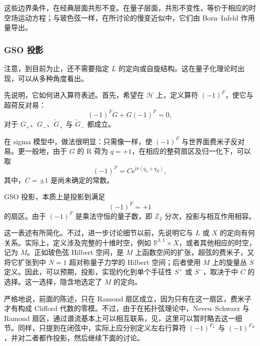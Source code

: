 这些边界条件，在经典层面共形不变。在量子层面，共形不变性，等价于相应的时空场运动方程；与玻色弦一样，在所讨论的慢变近似中，它们由 Born--Infeld 作用量导出。

\subsubsection{GSO 投影}\label{sec:3.5.3.2}

注意，到目前为止，还不需要指定 $L$ 的定向或自旋结构。这在量子化理论时出现，可以从多种角度看出。

先说明，它如何进入算符表述。首先，希望在 $\mathcal{H}$ 上，定义算符 $(-1)^F$，使它与超荷反对易：
\[
(-1)^FG+G(-1)^F=0,
\]
对于 $G_+$、$G_-$、$\widetilde G_+$ 与 $\widetilde G_-$ 都成立。

在 sigma 模型中，做法很明显：只需像一样，使 $(-1)^F$ 与世界面费米子反对易。更一般地，由于 $G$ 的 R 荷为 $q=+1$，在相应的整荷扇区及归一化下，可以取
\begin{equation}\label{eq:3.157}
(-1)^F=C\mathrm{e}^{\mathrm{i}\pi(q_L+q_R)},
\end{equation}
其中，$C=\pm1$ 是尚未确定的常数。

GSO 投影，本质上是投影到满足
\begin{equation}\label{eq:3.158}
(-1)^F=+1
\end{equation}
的扇区。由于 $(-1)^F$ 是乘法守恒的量子数，即 $\mathbb{Z}_2$ 分次，投影与相互作用相容。

这一表述有所简化。不过，进一步讨论细节以前，先说明它与 $L$ 或 $X$ 的定向有何关系。实际上，定义涉及完整的十维时空，例如 $\mathbb{R}^{3,1}\times X$，或者其他相应的时空，记为 $M$。正如玻色弦 Hilbert 空间，是 $M$ 上函数空间的扩张，超弦的费米子，又将它扩张到中 $N=1$ 超对称量子力学的 Hilbert 空间；后者使用 $M$ 上的旋量丛 $S$ 定义。因此，可以预期，投影，实现约化到单个手征性 $S^+$ 或 $S^-$，取决于中 $C$ 的选择。这一选择，隐含地选定了 $M$ 的定向。

严格地说，前面的陈述，只在 Ramond 扇区成立，因为只有在这一扇区，费米子才有构成 Clifford 代数的零模。不过，由于在拓扑弦理论中，Neveu--Schwarz 与 Ramond 扇区，通过谱流基本上可以相互联系，见，这里可以暂时略去这一细节。同样，只提到在闭弦中，实际上应分别定义左右行算符 $(-1)^{F_L}$ 与 $(-1)^{F_R}$，并对二者都作投影，然后继续下面的讨论。

